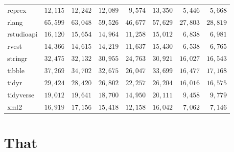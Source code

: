 \documentclass[]{article}
\begin{document}
\begin{longtable}{lrrrrrrr}
reprex & $12,115$ & $12,242$ & $12,089$ & $9,574$ & $13,350$ & $5,446$ & $5,668$ \\ 
rlang & $65,599$ & $63,048$ & $59,526$ & $46,677$ & $57,629$ & $27,803$ & $28,819$ \\ 
rstudioapi & $16,120$ & $15,654$ & $14,964$ & $11,258$ & $15,012$ & $6,838$ & $6,981$ \\ 
rvest & $14,366$ & $14,615$ & $14,219$ & $11,637$ & $15,430$ & $6,538$ & $6,765$ \\ 
stringr & $32,475$ & $32,132$ & $30,955$ & $24,763$ & $30,921$ & $16,027$ & $16,543$ \\ 
tibble & $37,269$ & $34,702$ & $32,675$ & $26,047$ & $33,699$ & $16,477$ & $17,168$ \\ 
tidyr & $29,424$ & $28,420$ & $26,802$ & $22,257$ & $26,204$ & $16,016$ & $16,575$ \\ 
tidyverse & $19,012$ & $19,641$ & $18,700$ & $14,950$ & $20,111$ & $9,458$ & $9,779$ \\ 
xml2 & $16,919$ & $17,156$ & $15,418$ & $12,158$ & $16,042$ & $7,062$ & $7,146$ \\ 
\bottomrule
\end{longtable}

\newpage

\hypertarget{that}{%
\section{That}\label{that}}
\end{document}
